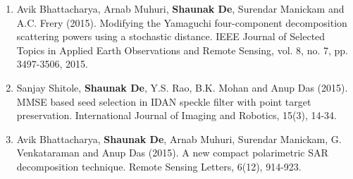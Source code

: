 {\begin{enumerate}
\item Avik Bhattacharya, Arnab Muhuri, \textbf{Shaunak De}, Surendar Manickam and A.C. Frery (2015). Modifying the Yamaguchi four-component decomposition scattering powers using a stochastic distance. IEEE Journal of Selected Topics in Applied Earth Observations and Remote Sensing, vol. 8, no. 7, pp. 3497-3506, 2015.

\item Sanjay Shitole, \textbf{Shaunak De}, Y.S. Rao, B.K. Mohan and Anup Das (2015). MMSE based seed selection in IDAN speckle filter with point target preservation. International Journal of Imaging and Robotics, 15(3), 14-34.

\item Avik Bhattacharya, \textbf{Shaunak De}, Arnab Muhuri, Surendar Manickam, G. Venkataraman and Anup Das (2015). A new compact polarimetric SAR decomposition technique. Remote Sensing Letters, 6(12), 914-923.

\end{enumerate}
}
